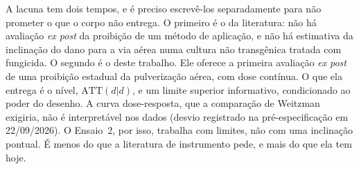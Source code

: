 A lacuna tem dois tempos, e é preciso escrevê-los separadamente para não
prometer o que o corpo não entrega. O primeiro é o da literatura: não há
avaliação \emph{ex post} da proibição de um método de aplicação, e não há
estimativa da inclinação do dano para a via aérea numa cultura não transgênica
tratada com fungicida. O segundo é o deste trabalho. Ele oferece a primeira
avaliação \emph{ex post} de uma proibição estadual da pulverização aérea, com
dose contínua. O que ela entrega é o nível, $\text{ATT}(d|d)$, e um limite
superior informativo, condicionado ao poder do desenho. A curva dose-resposta,
que a comparação de Weitzman exigiria, não é interpretável nos dados (desvio
registrado na pré-especificação em 22/09/2026). O Ensaio~2, por isso, trabalha
com limites, não com uma inclinação pontual. É menos do que a literatura de
instrumento pede, e mais do que ela tem hoje.

{\small


}

